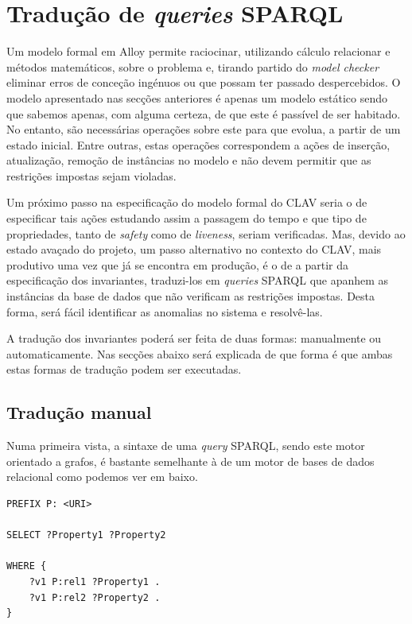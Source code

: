 \documentclass[tikz,runningheads,a4paper]{llncs}
\begin{document}
\section{Tradução de \textit{queries} SPARQL}
\label{SecQueries}

Um modelo formal em Alloy permite raciocinar, utilizando cálculo relacionar e
métodos matemáticos, sobre o problema e, tirando partido do \textit{model
checker} eliminar erros de conceção ingénuos ou que possam ter passado
despercebidos. O modelo apresentado nas secções anteriores é apenas um modelo
estático sendo que sabemos apenas, com alguma certeza, de que este é passível de
ser habitado. No entanto, são necessárias operações sobre este para que evolua,
a partir de um estado inicial. Entre outras, estas operações correspondem a
ações de inserção, atualização, remoção de instâncias no modelo e não devem
permitir que as restrições impostas sejam violadas.

Um próximo passo na especificação do modelo formal do CLAV seria o de
especificar tais ações estudando assim a passagem do tempo e que tipo de
propriedades, tanto de \textit{safety} como de \textit{liveness}, seriam
verificadas. Mas, devido ao estado avaçado do projeto, um passo alternativo no
contexto do CLAV, mais produtivo uma vez que já se encontra em produção, é o de
a partir da especificação dos invariantes, traduzi-los em \textit{queries}
SPARQL que apanhem as instâncias da base de dados que não verificam as
restrições impostas. Desta forma, será fácil identificar as anomalias no sistema
e resolvê-las.

A tradução dos invariantes poderá ser feita de duas formas: manualmente ou
automaticamente. Nas secções abaixo será explicada de que forma é que ambas
estas formas de tradução podem ser executadas.

\subsection{Tradução manual}

Numa primeira vista, a sintaxe de uma \textit{query} SPARQL, sendo este motor
orientado a grafos, é bastante semelhante à de um motor de bases de dados
relacional como podemos ver em baixo.

\begin{verbatim}
PREFIX P: <URI>

SELECT ?Property1 ?Property2

WHERE {
    ?v1 P:rel1 ?Property1 .
    ?v1 P:rel2 ?Property2 .
}
\end{verbatim}
\end{document}
